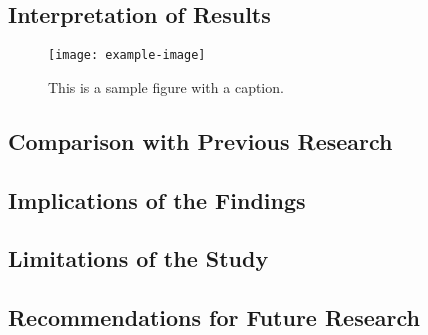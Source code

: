 \subsection{Interpretation of Results}

\begin{figure}[ht]
    \centering
    \texttt{[image: example-image]}
    \caption{This is a sample figure with a caption.}
    \label{fig:sample}
\end{figure}
\subsection{Comparison with Previous Research}


\subsection{Implications of the Findings}

\subsection{Limitations of the Study}


\subsection{Recommendations for Future Research}
